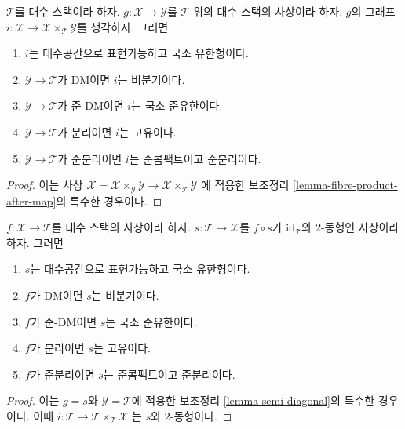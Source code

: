 \begin{lemma}
\label{lemma-semi-diagonal}
$\mathcal{T}$를 대수 스택이라 하자.
$g : \mathcal{X} \to \mathcal{Y}$를 $\mathcal{T}$ 위의
대수 스택의 사상이라 하자. $g$의 그래프
$i : \mathcal{X} \to \mathcal{X} \times_\mathcal{T} \mathcal{Y}$를
생각하자. 그러면
\begin{enumerate}
\item $i$는 대수공간으로 표현가능하고 국소 유한형이다.
\item $\mathcal{Y} \to \mathcal{T}$가 DM이면 $i$는 비분기이다.
\item $\mathcal{Y} \to \mathcal{T}$가 준-DM이면
$i$는 국소 준유한이다.
\item $\mathcal{Y} \to \mathcal{T}$가 분리이면 $i$는 고유이다.
\item $\mathcal{Y} \to \mathcal{T}$가 준분리이면
$i$는 준콤팩트이고 준분리이다.
\end{enumerate}
\end{lemma}

\begin{proof}
이는 사상
$\mathcal{X} = \mathcal{X} \times_\mathcal{Y} \mathcal{Y} \to
\mathcal{X} \times_\mathcal{T} \mathcal{Y}$
에 적용한 보조정리 \ref{lemma-fibre-product-after-map}의 특수한 경우이다.
\end{proof}

\begin{lemma}
\label{lemma-section-immersion}
$f : \mathcal{X} \to \mathcal{T}$를 대수 스택의 사상이라 하자.
$s : \mathcal{T} \to \mathcal{X}$를 $f \circ s$가
$\text{id}_\mathcal{T}$와 $2$-동형인 사상이라 하자. 그러면
\begin{enumerate}
\item $s$는 대수공간으로 표현가능하고 국소 유한형이다.
\item $f$가 DM이면 $s$는 비분기이다.
\item $f$가 준-DM이면 $s$는 국소 준유한이다.
\item $f$가 분리이면 $s$는 고유이다.
\item $f$가 준분리이면 $s$는 준콤팩트이고 준분리이다.
\end{enumerate}
\end{lemma}

\begin{proof}
이는 $g=s$와 $\mathcal{Y}=\mathcal{T}$에 적용한 보조정리
\ref{lemma-semi-diagonal}의 특수한 경우이다. 이때
$i : \mathcal{T} \to \mathcal{T} \times_\mathcal{T} \mathcal{X}$
는 $s$와 $2$-동형이다.
\end{proof}

